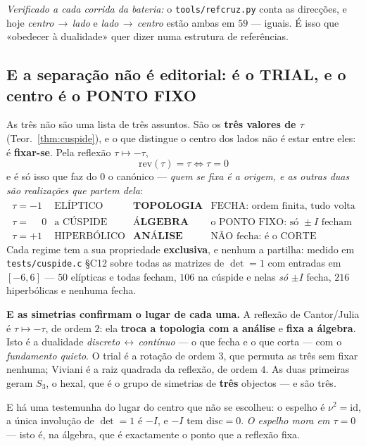 \documentclass[11pt,a4paper]{article}
\newcommand{\code}[1]{\texttt{\small #1}}
\begin{document}
\medskip
\noindent\emph{Verificado a cada corrida da bateria:} o \code{tools/refcruz.py} conta as
direcções, e hoje \emph{centro\,$\to$\,lado} e \emph{lado\,$\to$\,centro} estão ambas em
$59$ --- iguais. É isso que «obedecer à dualidade» quer dizer numa estrutura de referências.

\subsection*{E a separação não é editorial: é o TRIAL, e o centro é o PONTO FIXO}

As três não são uma lista de três assuntos. São os \textbf{três valores de $\tau$}
(Teor.~\ref{thm:cuspide}), e o que distingue o centro dos lados não é estar entre eles:
é \textbf{fixar-se}. Pela reflexão $\tau\mapsto-\tau$,
\[
\boxed{\;\mathrm{rev}(\tau)=\tau\iff\tau=0\;}
\]
e é só isso que faz do $0$ o canónico --- \emph{quem se fixa é a origem, e as outras duas
são realizações que partem dela}:
\[
\begin{array}{clll}
\tau=-1 & \text{ELÍPTICO} & \textbf{TOPOLOGIA} & \text{FECHA: ordem finita, tudo volta}\\[2pt]
\tau=\phantom{-}0 & \text{a CÚSPIDE} & \textbf{ÁLGEBRA} & \text{o PONTO FIXO: só }\pm I\text{ fecham}\\[2pt]
\tau=+1 & \text{HIPERBÓLICO} & \textbf{ANÁLISE} & \text{NÃO fecha: é o CORTE}
\end{array}
\]
Cada regime tem a sua propriedade \textbf{exclusiva}, e nenhum a partilha: medido em
\code{tests/cuspide.c} \S C12 sobre todas as matrizes de $\det=1$ com entradas em
$[-6,6]$ --- $50$ elípticas e todas fecham, $106$ na cúspide e nelas \emph{só} $\pm I$
fecha, $216$ hiperbólicas e nenhuma fecha.

\medskip
\noindent\textbf{E as simetrias confirmam o lugar de cada uma.} A reflexão de
Cantor/Julia é $\tau\mapsto-\tau$, de ordem $2$: ela \textbf{troca a topologia com a
análise} e \textbf{fixa a álgebra}. Isto é a dualidade \emph{discreto\,$\leftrightarrow$\,contínuo}
--- o que fecha e o que corta --- com o \emph{fundamento quieto}. O trial é a rotação de
ordem $3$, que permuta as três sem fixar nenhuma; Viviani é a raiz quadrada da reflexão,
de ordem $4$. As duas primeiras geram $S_3$, o hexal, que é o grupo de simetrias de
\textbf{três} objectos --- e são três.

E há uma testemunha do lugar do centro que não se escolheu: o espelho é $\nu^2=\mathrm{id}$,
a única involução de $\det=1$ é $-I$, e $-I$ tem $\mathrm{disc}=0$. \emph{O espelho mora
em $\tau=0$} --- isto é, na álgebra, que é exactamente o ponto que a reflexão fixa.
\end{document}
